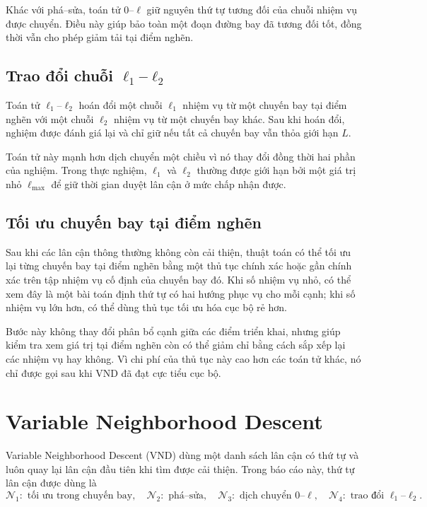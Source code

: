 Khác với phá--sửa, toán tử \(0\)--\(\ell\) giữ nguyên thứ tự tương đối của chuỗi nhiệm vụ được chuyển. Điều này giúp bảo toàn một đoạn đường bay đã tương đối tốt, đồng thời vẫn cho phép giảm tải tại điểm nghẽn.

\subsection{Trao đổi chuỗi \(\ell_1\)--\(\ell_2\)}

Toán tử \(\ell_1\)--\(\ell_2\) hoán đổi một chuỗi \(\ell_1\) nhiệm vụ từ một chuyến bay tại điểm nghẽn với một chuỗi \(\ell_2\) nhiệm vụ từ một chuyến bay khác. Sau khi hoán đổi, nghiệm được đánh giá lại và chỉ giữ nếu tất cả chuyến bay vẫn thỏa giới hạn \(L\).

Toán tử này mạnh hơn dịch chuyển một chiều vì nó thay đổi đồng thời hai phần của nghiệm. Trong thực nghiệm, \(\ell_1\) và \(\ell_2\) thường được giới hạn bởi một giá trị nhỏ \(\ell_{\max}\) để giữ thời gian duyệt lân cận ở mức chấp nhận được.

\subsection{Tối ưu chuyến bay tại điểm nghẽn}

Sau khi các lân cận thông thường không còn cải thiện, thuật toán có thể tối ưu lại từng chuyến bay tại điểm nghẽn bằng một thủ tục chính xác hoặc gần chính xác trên tập nhiệm vụ cố định của chuyến bay đó. Khi số nhiệm vụ nhỏ, có thể xem đây là một bài toán định thứ tự có hai hướng phục vụ cho mỗi cạnh; khi số nhiệm vụ lớn hơn, có thể dùng thủ tục tối ưu hóa cục bộ rẻ hơn.

Bước này không thay đổi phân bổ cạnh giữa các điểm triển khai, nhưng giúp kiểm tra xem giá trị tại điểm nghẽn còn có thể giảm chỉ bằng cách sắp xếp lại các nhiệm vụ hay không. Vì chi phí của thủ tục này cao hơn các toán tử khác, nó chỉ được gọi sau khi VND đã đạt cực tiểu cục bộ.

\section{Variable Neighborhood Descent}

Variable Neighborhood Descent (VND) dùng một danh sách lân cận có thứ tự và luôn quay lại lân cận đầu tiên khi tìm được cải thiện. Trong báo cáo này, thứ tự lân cận được dùng là
\[
\mathcal{N}_1:\text{ tối ưu trong chuyến bay},\quad
\mathcal{N}_2:\text{ phá--sửa},\quad
\mathcal{N}_3:\text{ dịch chuyển }0\text{--}\ell,\quad
\mathcal{N}_4:\text{ trao đổi }\ell_1\text{--}\ell_2.
\]


